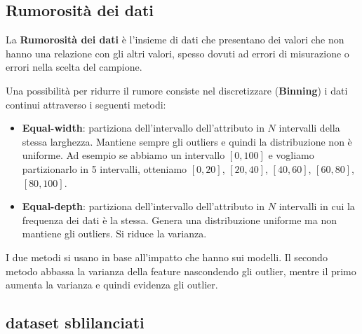 \subsection{Rumorosità dei dati}
\begin{definizione} 
    La \textbf{Rumorosità dei dati} è l'insieme di dati che presentano dei
    valori che non hanno una relazione con gli altri valori, spesso dovuti ad
    errori di misurazione o errori nella scelta del campione.
\end{definizione}
Una possibilità per ridurre il rumore consiste nel discretizzare (\textbf{Binning})
i dati continui attraverso i seguenti metodi:
\begin{itemize}
    \item \textbf{Equal-width}: partiziona dell'intervallo dell'attributo in $N$
          intervalli della stessa larghezza. Mantiene sempre gli outliers e
          quindi la distribuzione non è uniforme.
          Ad esempio se abbiamo un intervallo $[0, 100]$ e vogliamo partizionarlo
          in 5 intervalli, otteniamo $[0, 20]$, $[20, 40]$, $[40, 60]$, $[60, 80]$,
          $[80, 100]$.
    \item \textbf{Equal-depth}: partiziona dell'intervallo dell'attributo in $N$
          intervalli in cui la frequenza dei dati è la stessa. Genera una
          distribuzione uniforme ma non mantiene gli outliers. Si riduce la
          varianza.
\end{itemize}

I due metodi si usano in base all'impatto che hanno sui modelli. Il secondo
metodo abbassa la varianza della feature nascondendo gli outlier, mentre il primo
aumenta la varianza e quindi evidenza gli outlier.

\subsection{dataset sblilanciati}